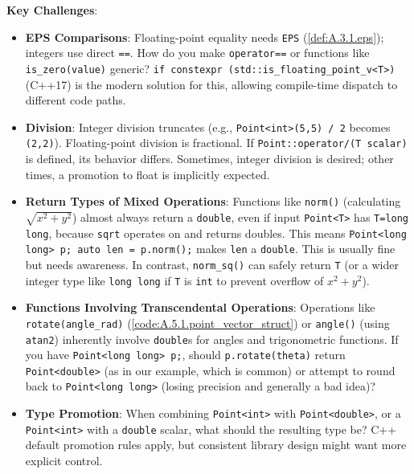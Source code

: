 \begin{openquestion}
\textbf{Key Challenges}:
\begin{itemize}
    \item \textbf{EPS Comparisons}: Floating-point equality needs \texttt{EPS} (\cref{def:A.3.1.eps}); integers use direct \texttt{==}. How do you make \texttt{operator==} or functions like \texttt{is\_zero(value)} generic? \texttt{if constexpr (std::is\_floating\_point\_v<T>)} (C++17) is the modern solution for this, allowing compile-time dispatch to different code paths.
    \item \textbf{Division}: Integer division truncates (e.g., \texttt{Point<int>(5,5) / 2} becomes \texttt{(2,2)}). Floating-point division is fractional. If \texttt{Point::operator/(T scalar)} is defined, its behavior differs. Sometimes, integer division is desired; other times, a promotion to float is implicitly expected.
    \item \textbf{Return Types of Mixed Operations}: Functions like \texttt{norm()} (calculating $\sqrt{x^2+y^2}$) almost always return a \texttt{double}, even if input \texttt{Point<T>} has \texttt{T=long long}, because \texttt{sqrt} operates on and returns doubles. This means \texttt{Point<long long> p; auto len = p.norm();} makes \texttt{len} a \texttt{double}. This is usually fine but needs awareness. In contrast, \texttt{norm\_sq()} can safely return \texttt{T} (or a wider integer type like \texttt{long long} if \texttt{T} is \texttt{int} to prevent overflow of $x^2+y^2$).
    \item \textbf{Functions Involving Transcendental Operations}: Operations like \texttt{rotate(angle\_rad)} (\cref{code:A.5.1.point_vector_struct}) or \texttt{angle()} (using \texttt{atan2}) inherently involve \texttt{double}s for angles and trigonometric functions. If you have \texttt{Point<long long> p;}, should \texttt{p.rotate(theta)} return \texttt{Point<double>} (as in our example, which is common) or attempt to round back to \texttt{Point<long long>} (losing precision and generally a bad idea)?
    \item \textbf{Type Promotion}: When combining \texttt{Point<int>} with \texttt{Point<double>}, or a \texttt{Point<int>} with a \texttt{double} scalar, what should the resulting type be? C++ default promotion rules apply, but consistent library design might want more explicit control.
\end{itemize}


\end{openquestion}
